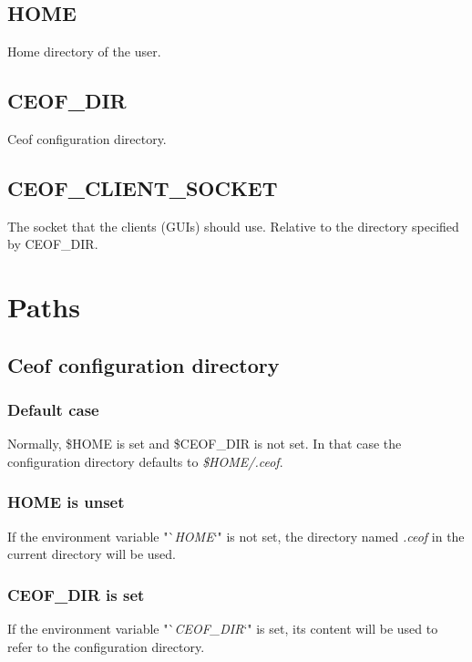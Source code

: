 \documentclass[12pt,a4paper]{article}
\begin{document}
\subsection{HOME}
Home directory of the user.
\subsection{CEOF\_DIR}
Ceof configuration directory.
\subsection{CEOF\_CLIENT\_SOCKET}
The socket that the clients (GUIs) should use.
Relative to the directory specified by CEOF\_DIR.
\section{Paths}
\subsection{Ceof configuration directory}
\subsubsection{Default case}
Normally, \$HOME is set and \$CEOF\_DIR is not set. In that case
the configuration directory defaults to \textit{\$HOME/.ceof}.
\subsubsection{HOME is unset}
If the environment variable "`\textit{HOME}`" is not set,
the directory named \textit{.ceof} in the current directory will be used.
\subsubsection{CEOF\_DIR is set}
If the environment variable "`\textit{CEOF\_DIR}`" is set,
its content will be used to refer to the configuration directory.
\end{document}
